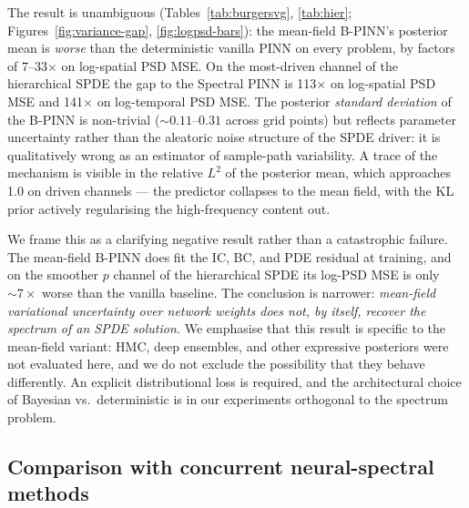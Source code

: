 \documentclass[review,12pt]{elsarticle}
\begin{document}
The result is unambiguous (Tables~\ref{tab:burgersvg},
\ref{tab:hier}; Figures~\ref{fig:variance-gap},
\ref{fig:logpsd-bars}): the mean-field B-PINN's posterior mean is
\emph{worse} than the deterministic vanilla PINN on every
problem, by factors of 7--33\(\times\) on log-spatial PSD MSE.
On the most-driven channel of the hierarchical SPDE the gap to
the Spectral PINN is 113\(\times\) on log-spatial PSD MSE and
141\(\times\) on log-temporal PSD MSE. The posterior
\emph{standard deviation} of the B-PINN is non-trivial
(\(\sim 0.11\)--\(0.31\) across grid points) but reflects
parameter uncertainty rather than the aleatoric noise structure
of the SPDE driver: it is qualitatively wrong as an estimator of
sample-path variability. A trace of the mechanism is visible in
the relative \(L^2\) of the posterior mean, which approaches 1.0
on driven channels --- the predictor collapses to the mean field,
with the KL prior actively regularising the high-frequency
content out.

We frame this as a clarifying negative result rather than a
catastrophic failure. The mean-field B-PINN does fit the IC, BC,
and PDE residual at training, and on the smoother \(p\) channel
of the hierarchical SPDE its log-PSD MSE is only \(\sim 7\times\)
worse than the vanilla baseline. The conclusion is narrower:
\emph{mean-field variational uncertainty over network weights
does not, by itself, recover the spectrum of an SPDE solution.}
We emphasise that this result is specific to the mean-field
variant: HMC, deep ensembles, and other expressive posteriors
were not evaluated here, and we do not exclude the possibility
that they behave differently. An explicit distributional loss is
required, and the architectural choice of Bayesian vs.\
deterministic is in our experiments orthogonal to the spectrum
problem.

\subsection{Comparison with concurrent neural-spectral methods}
\label{subsec:concurrent}
\end{document}
